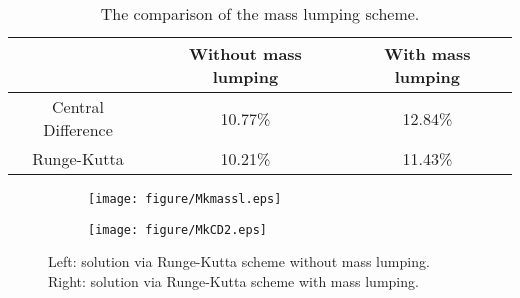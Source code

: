 \documentclass[preprint,12pt]{elsarticle}
\begin{document}
\begin{table}[H]
\centering
\begin{tabular}{c|c|c}
~ & Without mass lumping & With mass lumping  \\
\hline
Central Difference& 10.77\% & 12.84\%  \\
\hline
Runge-Kutta & 10.21\% & 11.43\%  \\
\hline
\end{tabular}
\caption{The comparison of the mass lumping scheme.}
 \label{tableMK3}
\end{table}
\begin{figure}[H]
    \centering
    \begin{subfigure}{0.45\textwidth}
        \texttt{[image: figure/Mkmassl.eps]}
        \caption{}
        \label{fig:image21}
    \end{subfigure}
    \begin{subfigure}{0.45\textwidth}
        \texttt{[image: figure/MkCD2.eps]}
        \caption{}
        \label{fig:image22}
    \end{subfigure}
    \caption{Left: solution via Runge-Kutta scheme without mass lumping. Right: solution via Runge-Kutta scheme with mass lumping.}
    \label{fig:ml}
\end{figure}
\end{document}

